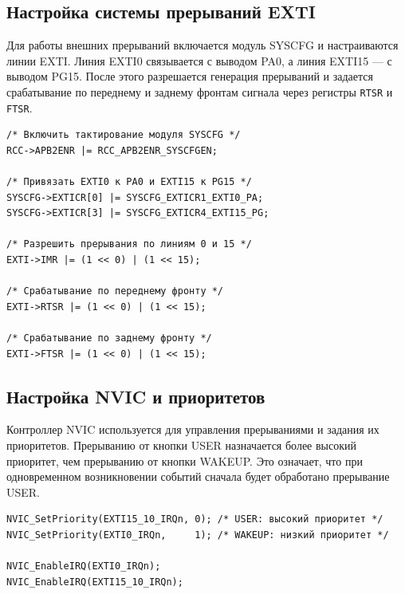 \subsection{Настройка системы прерываний EXTI}

Для работы внешних прерываний включается модуль SYSCFG и настраиваются линии EXTI.
Линия EXTI0 связывается с выводом PA0, а линия EXTI15 --- с выводом PG15.
После этого разрешается генерация прерываний и задается срабатывание по переднему и заднему фронтам сигнала через регистры \verb|RTSR| и \verb|FTSR|.

\begin{listing}[H]
\caption{Настройка EXTI}
\begin{verbatim}
/* Включить тактирование модуля SYSCFG */
RCC->APB2ENR |= RCC_APB2ENR_SYSCFGEN;

/* Привязать EXTI0 к PA0 и EXTI15 к PG15 */
SYSCFG->EXTICR[0] |= SYSCFG_EXTICR1_EXTI0_PA;
SYSCFG->EXTICR[3] |= SYSCFG_EXTICR4_EXTI15_PG;

/* Разрешить прерывания по линиям 0 и 15 */
EXTI->IMR |= (1 << 0) | (1 << 15);

/* Срабатывание по переднему фронту */
EXTI->RTSR |= (1 << 0) | (1 << 15);

/* Срабатывание по заднему фронту */
EXTI->FTSR |= (1 << 0) | (1 << 15);
\end{verbatim}
\end{listing}

\subsection{Настройка NVIC и приоритетов}

Контроллер NVIC используется для управления прерываниями и задания их приоритетов.
Прерыванию от кнопки USER назначается более высокий приоритет, чем прерыванию от кнопки WAKEUP.
Это означает, что при одновременном возникновении событий сначала будет обработано прерывание USER.

\begin{listing}[H]
\caption{Настройка NVIC}
\begin{verbatim}
NVIC_SetPriority(EXTI15_10_IRQn, 0); /* USER: высокий приоритет */
NVIC_SetPriority(EXTI0_IRQn,     1); /* WAKEUP: низкий приоритет */

NVIC_EnableIRQ(EXTI0_IRQn);
NVIC_EnableIRQ(EXTI15_10_IRQn);
\end{verbatim}
\end{listing}

